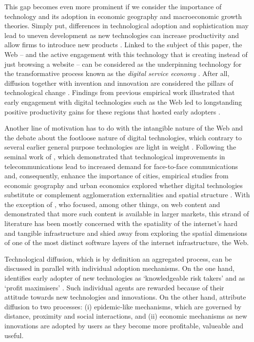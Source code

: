 \documentclass[
  authoryear,
  preprint,
  3p]{elsarticle}
\begin{document}
This gap becomes even more prominent if we consider the importance of
technology and its adoption in economic geography and macroeconomic
growth theories. Simply put, differences in technological adoption and
sophistication may lead to uneven development as new technologies can
increase productivity and allow firms to introduce new products
\citep{solow1957technical, aghion1990model, kemeny2011international}.
Linked to the subject of this paper, the Web -- and the active
engagement with this technology that is creating instead of just
browsing a website -- can be considered as the underpinning technology
for the transformative process known as the \emph{digital service
economy} \citep{capello2024nexus}. After all, diffusion together with
invention and innovation are considered the pillars of technological
change \citep{das2022diffusion}. Findings from previous empirical work
illustrated that early engagement with digital technologies such as the
Web led to longstanding positive productivity gains for these regions
that hosted early adopters \citep{tranosuk}.

Another line of motivation has to do with the intangible nature of the
Web and the debate about the footloose nature of digital technologies,
which contrary to several earlier general purpose technologies are light
in weight \citep{coyle1999weightless}. Following the seminal work of
\citet{gaspar1998information}, which demonstrated that technological
improvements in telecommunications lead to increased demand for
face-to-face communications and, consequently, enhance the importance of
cities, empirical studies from economic geography and urban economics
explored whether digital technologies substitute or complement
agglomeration externalities and spatial structure
\citep{kolko_death_2000, ioannides2008effect, tranos2021ubiquitous}.
With the exception of \citet{sinai2004geography}, who focused, among
other things, on web content and demonstrated that more such content is
available in larger markets, this strand of literature has been mostly
concerned with the spatiality of the internet's hard and tangible
infrastructure and shied away from exploring the spatial dimensions of
one of the most distinct software layers of the internet infrastructure,
the Web.

Technological diffusion, which is by definition an aggregated process,
can be discussed in parallel with individual adoption mechanisms. On the
one hand, \citet{rogers2010diffusion} identifies early adopter of new
technologies as `knowledgeable risk takers' and \citet{griliches1957} as
`profit maximisers' \citep{ding2010modeling}. Such individual agents are
rewarded because of their attitude towards new technologies and
innovations. On the other hand, \citet{perkins2011internet} attribute
diffusion to two processes: (i) epidemic-like mechanisms, which are
governed by distance, proximity and social interactions, and (ii)
economic mechanisms as new innovations are adopted by users as they
become more profitable, valueable and useful.
\end{document}
